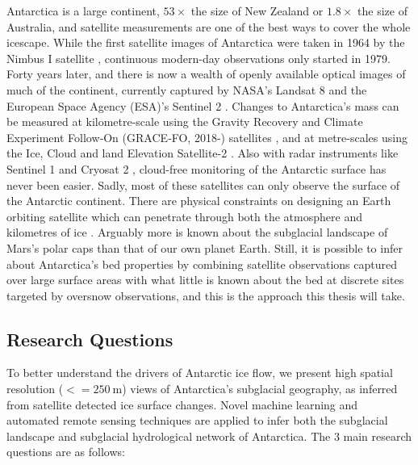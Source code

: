 Antarctica is a large continent, $53\times$ the size of New Zealand or $1.8\times$ the size of Australia, and satellite measurements are one of the best ways to cover the whole icescape.
While the first satellite images of Antarctica were taken in 1964 by the Nimbus I satellite \citep{MeierNewestimatesArctic2013}, continuous modern-day observations only started in 1979.
Forty years later, and there is now a wealth of openly available optical images of much of the continent, currently captured by NASA's Landsat 8 \citep[][]{RoyLandsat8Scienceproduct2014} and the European Space Agency (ESA)'s Sentinel 2 \citep{DruschSentinel2ESAOptical2012}.
Changes to Antarctica's mass can be measured at kilometre-scale using the Gravity Recovery and Climate Experiment Follow‐On (GRACE‐FO, 2018-) satellites \citep{LandererExtendingGlobalMass2020}, and at metre-scales using the Ice, Cloud and land Elevation Satellite-2 \citep[ICESat-2, 2018-;][]{MarkusIceCloudland2017}.
Also with radar instruments like Sentinel 1 \citep{AttemaSentinel1missionoverview2009} and Cryosat 2 \citep{WinghamCryoSatmissiondetermine2006}, cloud-free monitoring of the Antarctic surface has never been easier.
Sadly, most of these satellites can only observe the surface of the Antarctic continent.
There are physical constraints on designing an Earth orbiting satellite which can penetrate through both the atmosphere and kilometres of ice \citep{GogineniCubeSatTrainRadar2018,CulbergFirnClutterConstraints2020}.
Arguably more is known about the subglacial landscape of Mars's polar caps \citep{OroseiRadarevidencesubglacial2018,ArnoldModeledSubglacialWater2019,LauroMultiplesubglacialwater2020} than that of our own planet Earth.
Still, it is possible to infer about Antarctica's bed properties by combining satellite observations captured over large surface areas with what little is known about the bed at discrete sites targeted by oversnow observations, and this is the approach this thesis will take.

\subsection{Research Questions}

To better understand the drivers of Antarctic ice flow, we present high spatial resolution ($<= \SI{250}{\metre}$) views of Antarctica's subglacial geography, as inferred from satellite detected ice surface changes.
Novel machine learning and automated remote sensing techniques are applied to infer both the subglacial landscape and subglacial hydrological network of Antarctica.
The 3 main research questions are as follows:

